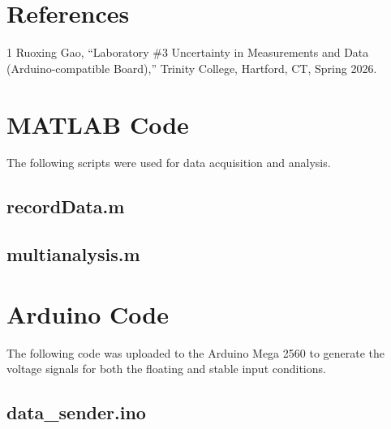 \documentclass[11pt]{article}
\begin{document}
\section{References}
\begin{thebibliography}{1}
  Ruoxing Gao, ``Laboratory \#3 Uncertainty in Measurements and Data (Arduino-compatible Board),'' Trinity College, Hartford, CT, Spring 2026.
\end{thebibliography}

\newpage
\appendix
\section{MATLAB Code}
The following scripts were used for data acquisition and analysis.

\subsection{recordData.m}


\subsection{multianalysis.m}


\section{Arduino Code}
The following code was uploaded to the Arduino Mega 2560 to generate the voltage signals for both the floating and stable input conditions.
\subsection{data\_sender.ino}

\end{document}
